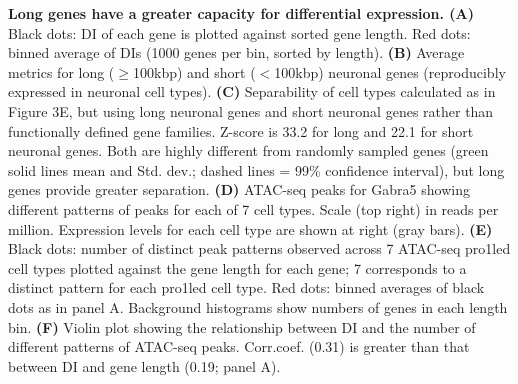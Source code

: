 \textbf{Long genes have a greater capacity for differential expression. (A)} Black dots: DI of each gene is plotted against sorted gene length. Red dots: binned average of DIs (1000 genes per bin, sorted by length). \textbf{(B)} Average metrics for long ($\geq$100kbp) and short ($<$100kbp) neuronal genes (reproducibly expressed in neuronal cell types). \textbf{(C)} Separability of cell types calculated as in Figure 3E, but using long neuronal genes and short neuronal genes rather than functionally defined gene families. Z-score is 33.2 for long and 22.1 for short neuronal genes. Both are highly different from randomly sampled genes (green solid lines mean and Std. dev.; dashed lines = 99\% confidence interval), but long genes provide greater separation. \textbf{(D)} ATAC-seq peaks for Gabra5 showing different patterns of peaks for each of 7 cell types. Scale (top right) in reads per million. Expression levels for each cell type are shown at right (gray bars). \textbf{(E)} Black dots: number of distinct peak patterns observed across 7 ATAC-seq pro1led cell types plotted against the gene length for each gene; 7 corresponds to a distinct pattern for each pro1led cell type. Red dots: binned averages of black dots as in panel A. Background histograms show numbers of genes in each length bin. \textbf{(F)} Violin plot showing the relationship between DI and the number of different patterns of ATAC-seq peaks. Corr.coef. (0.31) is greater than that between DI and gene length (0.19; panel A).  